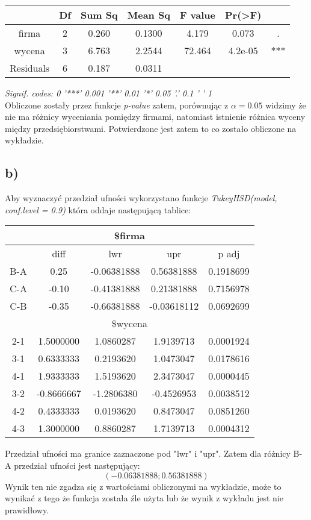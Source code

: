 \documentclass{article}
\begin{document}
\begin{center} \begin{tabular}{|c|c|c|c|c|c|c|} \hline
& Df & Sum Sq & Mean Sq & F value & Pr(>F) & \\ \hline
firma & 2 & 0.260 & 0.1300 & 4.179 & 0.073 & . \\ \hline
wycena & 3 & 6.763 & 2.2544 & 72.464 & 4.2e-05 & *** \\ \hline
Residuals & 6 & 0.187 & 0.0311 & & & \\ \hline
\end{tabular} \end{center}

\textit{Signif. codes:  0 '***' 0.001 '**' 0.01 '*' 0.05 '.' 0.1 ' ' 1} \\
Obliczone zostały przez funkcje \textit{p-value} zatem, porównując z $\alpha=0.05$ widzimy że nie ma różnicy wyceniania pomiędzy firmami, natomiast istnienie różnica wyceny między przedsiębiorstwami. Potwierdzone jest zatem to co zostało obliczone na wykładzie.

\subsection{b)}
Aby wyznaczyć przedział ufności wykorzystano funkcje \textit{TukeyHSD(model, conf.level = 0.9)} która oddaje następującą tablice:
\begin{center} \begin{tabular}{|c|c|c|c|c|} \hline
\multicolumn{5}{|c|}{\$firma} \\ \hline
& diff & lwr & upr & p adj \\ \hline
B-A & 0.25 & -0.06381888 & 0.56381888 & 0.1918699 \\ \hline
C-A & -0.10 & -0.41381888 & 0.21381888 & 0.7156978 \\ \hline
C-B & -0.35 & -0.66381888 & -0.03618112 & 0.0692699 \\ \hline
\multicolumn{5}{|c|}{\$wycena} \\ \hline
2-1 & 1.5000000 & 1.0860287 & 1.9139713 & 0.0001924 \\ \hline
3-1 & 0.6333333 & 0.2193620 & 1.0473047 & 0.0178616 \\ \hline
4-1 & 1.9333333 & 1.5193620 & 2.3473047 & 0.0000445 \\ \hline
3-2 & -0.8666667 & -1.2806380 & -0.4526953 & 0.0038512 \\ \hline
4-2 & 0.4333333 & 0.0193620 & 0.8473047 & 0.0851260 \\ \hline
4-3 & 1.3000000 & 0.8860287 & 1.7139713 & 0.0004312 \\ \hline
\end{tabular} \end{center}

Przedział ufności ma granice zaznaczone pod "lwr" i "upr". Zatem dla różnicy B-A przedział ufności jest następujący:
\[ (-0.06381888 ; 0.56381888 ) \]
Wynik ten nie zgadza się z wartościami obliczonymi na wykładzie, może to wynikać z tego że funkcja została źle użyta lub że wynik z wykładu jest nie prawidłowy.
\end{document}
